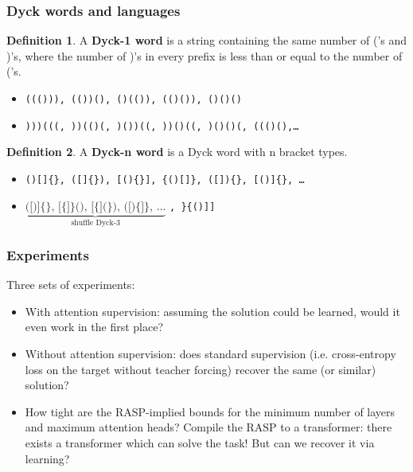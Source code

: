\documentclass[mathserif,notheorems]{beamer}
\newcommand{\cmark}{\color{green}\ding{51}}%
\newcommand{\xmark}{\color{red}\ding{55}}%
\theoremstyle{plain} %
\theoremstyle{definition} %
\newtheorem*{definition}{Definition} %
\begin{document}
  \begin{frame}
    \frametitle[short frame title]{Dyck words and languages}
    \begin{tcolorbox}
      \begin{definition}

        A \textbf{Dyck-1 word} is a string containing the same number of ('s and )'s, where the number of )'s in every prefix is less than or equal to the number of ('s.
      \end{definition}
    \end{tcolorbox}

    \begin{itemize}
      \item[\cmark]\texttt{((())), (())(), ()(()), (()()), ()()()}
      \item[\xmark]\texttt{)))(((, ))(()(, )())((, ))()((, )()()(, ((()(),\ldots}
    \end{itemize}

    \begin{tcolorbox}
      \begin{definition}
        A \textbf{Dyck-n word} is a Dyck word with n bracket types.
      \end{definition}
    \end{tcolorbox}

    \begin{itemize}
      \item[\cmark]\texttt{()[]\{\}, ([]\{\}), [()\{\}], \{()[]\}, ([])\{\}, [()]\{\}, \ldots}
      \item[\xmark]$\underbrace{\texttt{([)]\{\}, [\{]\}(),  [\{](\}), ([)\{]\}, } \ldots}_{\text{shuffle Dyck-3}}$ \texttt{, \}\{()]]}
    \end{itemize}
  \end{frame}

  \begin{frame}
    \frametitle{Experiments}
    Three sets of experiments:
    \begin{itemize}
      \item With attention supervision: assuming the solution could be learned, would it even work in the first place?
      \item Without attention supervision: does standard supervision (i.e. cross-entropy loss on the target without teacher forcing) recover the same (or similar) solution?
      \item How tight are the RASP-implied bounds for the minimum number of layers and maximum attention heads? Compile the RASP to a transformer: there exists a transformer which can solve the task! But can we recover it via learning?
    \end{itemize}
  \end{frame}
\end{document}

